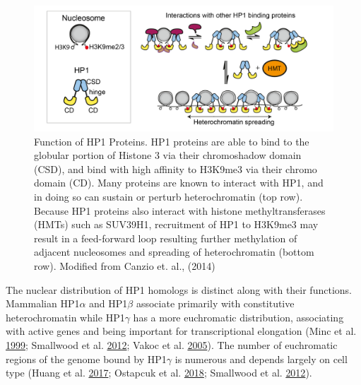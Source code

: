 \documentclass[onehalf,12pt]{beavtex}
\begin{document}
  \begin{figure}
  
  {\centering \includegraphics[width=1\linewidth, ]{./figure/introduction/HP1spreading} 
  
  }
  
  \caption[Function of HP1 Proteins]{Function of HP1 Proteins. HP1 proteins are able to bind to the globular portion of Histone 3 via their chromoshadow domain (CSD), and bind with high affinity to H3K9me3 via their chromo domain (CD).  Many proteins are known to interact with HP1, and in doing so can sustain or perturb heterochromatin (top row).  Because HP1 proteins also interact with histone methyltransferases (HMTs) such as SUV39H1, recruitment of HP1 to H3K9me3 may result in a feed-forward loop resulting further methylation of adjacent nucleosomes and spreading of heterochromatin (bottom row). Modified from Canzio et. al., (2014)}\label{fig:HP1spreading}
  \end{figure}
  
  The nuclear distribution of HP1 homologs is distinct along with their
  functions. Mammalian HP1\(\alpha\) and HP1\(\beta\) associate primarily
  with constitutive heterochromatin while HP1\(\gamma\) has a more
  euchromatic distribution, associating with active genes and being
  important for transcriptional elongation (Minc et al.
  \protect\hyperlink{ref-MincLocalizationphosphorylationHP11999}{1999};
  Smallwood et al.
  \protect\hyperlink{ref-SmallwoodCBX3regulatesefficient2012}{2012}; Vakoc
  et al. \protect\hyperlink{ref-VakocHistoneH3Lysine2005}{2005}). The
  number of euchromatic regions of the genome bound by HP1\(\gamma\) is
  numerous and depends largely on cell type (Huang et al.
  \protect\hyperlink{ref-HuangCbx3maintainslineage2017}{2017}; Ostapcuk et
  al.
  \protect\hyperlink{ref-OstapcukActivitydependentneuroprotectiveprotein2018}{2018};
  Smallwood et al.
  \protect\hyperlink{ref-SmallwoodCBX3regulatesefficient2012}{2012}).
  
\end{document}

